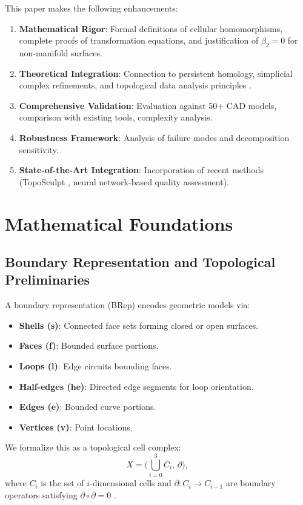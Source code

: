 \documentclass[conference]{IEEEtran}
\begin{document}
This paper makes the following enhancements:
\begin{enumerate}
\item \textbf{Mathematical Rigor}: Formal definitions of cellular homomorphisms, complete proofs of transformation equations, and justification of $\beta_2=0$ for non-manifold surfaces.
\item \textbf{Theoretical Integration}: Connection to persistent homology, simplicial complex refinements, and topological data analysis principles \cite{Chazal2021}.
\item \textbf{Comprehensive Validation}: Evaluation against 50+ CAD models, comparison with existing tools, complexity analysis.
\item \textbf{Robustness Framework}: Analysis of failure modes and decomposition sensitivity.
\item \textbf{State-of-the-Art Integration}: Incorporation of recent methods (TopoSculpt \cite{Hu2024}, neural network-based quality assessment).
\end{enumerate} 



\section{Mathematical Foundations}

\subsection{Boundary Representation and Topological Preliminaries}

A boundary representation (BRep) encodes geometric models via:
\begin{itemize}
    \item \textbf{Shells (s)}: Connected face sets forming closed or open surfaces.
    \item \textbf{Faces (f)}: Bounded surface portions.
    \item \textbf{Loops (l)}: Edge circuits bounding faces.
    \item \textbf{Half-edges (he)}: Directed edge segments for loop orientation.
    \item \textbf{Edges (e)}: Bounded curve portions.
    \item \textbf{Vertices (v)}: Point locations.
\end{itemize}

We formalize this as a topological cell complex:
\[
X = \bigl(\bigcup_{i=0}^{3} C_i,\, \partial \bigr),
\]
where $C_i$ is the set of $i$-dimensional cells and $\partial : C_i \to C_{i-1}$ are boundary operators satisfying $\partial \circ \partial = 0$ \cite{Munkres2000}.
\end{document}
